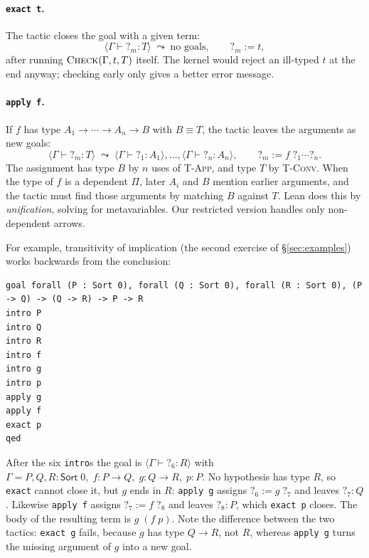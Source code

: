 \documentclass[acmsmall,screen,nonacm]{acmart}
\newcommand{\Sort}[1]{\mathsf{Sort}\;#1}
\newcommand{\conv}{\equiv}
\newcommand{\hole}[1]{?_{#1}}
\begin{document}
\paragraph{\texttt{exact t}.}
The tactic closes the goal with a given term:
\[
\langle \Gamma \vdash \hole{m} : T \rangle \;\leadsto\; \text{no goals},
\qquad
\hole{m} \mathrel{:=} t,
\]
after running $\textsc{Check}(\Gamma, t, T)$ itself.
The kernel would reject an ill-typed $t$ at the end anyway; checking early only gives a better error message.

\paragraph{\texttt{apply f}.}
If $f$ has type $A_1 \to \cdots \to A_n \to B$ with $B \conv T$, the tactic leaves the arguments as new goals:
\[
\langle \Gamma \vdash \hole{m} : T \rangle \;\leadsto\; \langle \Gamma \vdash \hole{1} : A_1 \rangle, \ldots, \langle \Gamma \vdash \hole{n} : A_n \rangle,
\qquad
\hole{m} \mathrel{:=} f\;\hole{1} \cdots \hole{n}.
\]
The assignment has type $B$ by $n$ uses of \textsc{T-App}, and type $T$ by \textsc{T-Conv}.
When the type of $f$ is a dependent $\Pi$, later $A_i$ and $B$ mention earlier arguments, and the tactic must find those arguments by matching $B$ against $T$.
Lean does this by \emph{unification}, solving for metavariables.
Our restricted version handles only non-dependent arrows.

For example, transitivity of implication (the second exercise of \S\ref{sec:examples}) works backwards from the conclusion:
\begin{lstlisting}[numbers=none, columns=fullflexible, keepspaces=true]
goal forall (P : Sort 0), forall (Q : Sort 0), forall (R : Sort 0), (P -> Q) -> (Q -> R) -> P -> R
intro P
intro Q
intro R
intro f
intro g
intro p
apply g
apply f
exact p
qed
\end{lstlisting}
After the six \texttt{intro}s the goal is $\langle \Gamma \vdash \hole{6} : R \rangle$ with $\Gamma = P, Q, R : \Sort{0},\; f : P \to Q,\; g : Q \to R,\; p : P$.
No hypothesis has type $R$, so \texttt{exact} cannot close it, but $g$ ends in $R$:
\texttt{apply g} assigns $\hole{6} \mathrel{:=} g\;\hole{7}$ and leaves $\hole{7} : Q$.
Likewise \texttt{apply f} assigns $\hole{7} \mathrel{:=} f\;\hole{8}$ and leaves $\hole{8} : P$, which \texttt{exact p} closes.
The body of the resulting term is $g\;(f\;p)$.
Note the difference between the two tactics: \texttt{exact g} fails, because $g$ has type $Q \to R$, not $R$,
whereas \texttt{apply g} turns the missing argument of $g$ into a new goal.
\end{document}

